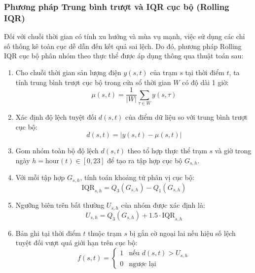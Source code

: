 \documentclass[12pt,a4paper]{article}
\begin{document}
\subsubsection{Phương pháp Trung bình trượt và IQR cục bộ (Rolling IQR)}
Đối với chuỗi thời gian có tính xu hướng và mùa vụ mạnh, việc sử dụng các chỉ số thống kê toàn cục dễ dẫn đến kết quả sai lệch. Do đó, phương pháp Rolling IQR cục bộ phân nhóm theo thực thể được áp dụng thông qua thuật toán sau:
\begin{enumerate}
    \item Cho chuỗi thời gian sản lượng điện $y(s, t)$ của trạm $s$ tại thời điểm $t$, ta tính trung bình trượt cục bộ trong cửa sổ thời gian $W$ có độ dài 1 giờ:
    \begin{equation}
        \mu(s, t) = \frac{1}{|W|} \sum_{\tau \in W} y(s, \tau)
    \end{equation}
    \item Xác định độ lệch tuyệt đối $d(s, t)$ của điểm dữ liệu so với trung bình trượt cục bộ:
    \begin{equation}
        d(s, t) = |y(s, t) - \mu(s, t)|
    \end{equation}
    \item Gom nhóm toàn bộ độ lệch $d(s, t)$ theo tổ hợp thực thể trạm $s$ và giờ trong ngày $h = \text{hour}(t) \in [0, 23]$ để tạo ra tập hợp cục bộ $G_{s, h}$.
    \item Với mỗi tập hợp $G_{s, h}$, tính toán khoảng tứ phân vị cục bộ:
    \begin{equation}
        \text{IQR}_{s, h} = Q_3(G_{s, h}) - Q_1(G_{s, h})
    \end{equation}
    \item Ngưỡng biên trên bất thường $U_{s, h}$ của nhóm được xác định là:
    \begin{equation}
        U_{s, h} = Q_3(G_{s, h}) + 1.5 \cdot \text{IQR}_{s, h}
    \end{equation}
    \item Bản ghi tại thời điểm $t$ thuộc trạm $s$ bị gắn cờ ngoại lai nếu hiệu số lệch tuyệt đối vượt quá giới hạn trên cục bộ:
    \begin{equation}
        f(s, t) = \begin{cases} 1 & \text{nếu } d(s, t) > U_{s, h} \\ 0 & \text{ngược lại} \end{cases}
    \end{equation}
\end{enumerate}
\end{document}
